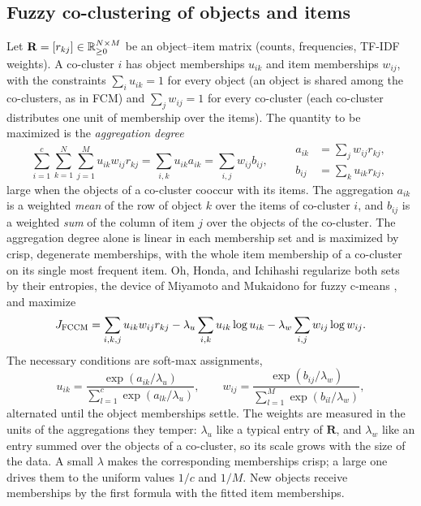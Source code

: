 \subsection{Fuzzy co-clustering of objects and items}\label{sec:beyond:fccm}

Let $\mathbf{R}=[r_{kj}]\in\mathbb{R}_{\ge0}^{N\times M}$ be an object--item matrix (counts, frequencies, TF-IDF weights). A co-cluster $i$ has object memberships $u_{ik}$ and item memberships $w_{ij}$, with the constraints $\sum_i u_{ik}=1$ for every object (an object is shared among the co-clusters, as in FCM) and $\sum_j w_{ij}=1$ for every co-cluster (each co-cluster distributes one unit of membership over the items). The quantity to be maximized is the \emph{aggregation degree}
\begin{equation}
  \sum_{i=1}^{c}\sum_{k=1}^{N}\sum_{j=1}^{M}u_{ik}w_{ij}r_{kj}=\sum_{i,k}u_{ik}a_{ik}=\sum_{i,j}w_{ij}b_{ij},\qquad
  \begin{aligned} a_{ik}&=\textstyle\sum_j w_{ij}r_{kj},\\ b_{ij}&=\textstyle\sum_k u_{ik}r_{kj},\end{aligned}
  \label{eq:beyond:aggregation}
\end{equation}
large when the objects of a co-cluster cooccur with its items. The aggregation $a_{ik}$ is a weighted \emph{mean} of the row of object $k$ over the items of co-cluster $i$, and $b_{ij}$ is a weighted \emph{sum} of the column of item $j$ over the objects of the co-cluster. The aggregation degree alone is linear in each membership set and is maximized by crisp, degenerate memberships, with the whole item membership of a co-cluster on its single most frequent item. Oh, Honda, and Ichihashi \cite{oh:2001:fccm} regularize both sets by their entropies, the device of Miyamoto and Mukaidono for fuzzy c-means \cite{miyamoto:1997:entropy}, and maximize
\begin{equation}
  J_{\mathrm{FCCM}}=\sum_{i,k,j}u_{ik}w_{ij}r_{kj}-\lambda_u\sum_{i,k}u_{ik}\log u_{ik}-\lambda_w\sum_{i,j}w_{ij}\log w_{ij}.
  \label{eq:beyond:Jfccm}
\end{equation}
The necessary conditions are soft-max assignments,
\begin{equation}
  u_{ik}=\frac{\exp(a_{ik}/\lambda_u)}{\sum_{l=1}^{c}\exp(a_{lk}/\lambda_u)},\qquad
  w_{ij}=\frac{\exp(b_{ij}/\lambda_w)}{\sum_{l=1}^{M}\exp(b_{il}/\lambda_w)},
  \label{eq:beyond:ufccm}
\end{equation}
alternated until the object memberships settle. The weights are measured in the units of the aggregations they temper: $\lambda_u$ like a typical entry of $\mathbf{R}$, and $\lambda_w$ like an entry summed over the objects of a co-cluster, so its scale grows with the size of the data. A small $\lambda$ makes the corresponding memberships crisp; a large one drives them to the uniform values $1/c$ and $1/M$. New objects receive memberships by the first formula with the fitted item memberships.

